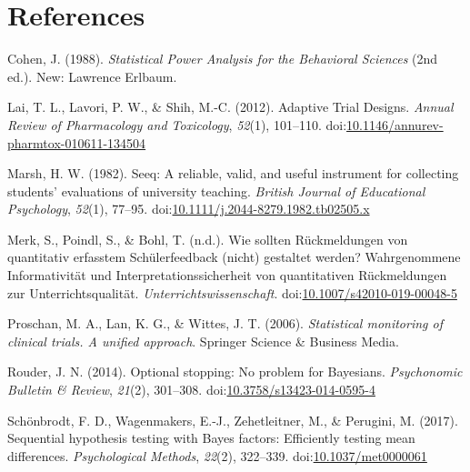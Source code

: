 \documentclass[man]{apa6}
\begin{document}
\hypertarget{references}{%
\section{References}\label{references}}

\begingroup
\setlength{\parindent}{-0.5in}
\setlength{\leftskip}{0.5in}

\hypertarget{refs}{}
\leavevmode\hypertarget{ref-cohen1988}{}%
Cohen, J. (1988). \emph{Statistical Power Analysis for the Behavioral Sciences} (2nd ed.). New: Lawrence Erlbaum.

\leavevmode\hypertarget{ref-lai2012}{}%
Lai, T. L., Lavori, P. W., \& Shih, M.-C. (2012). Adaptive Trial Designs. \emph{Annual Review of Pharmacology and Toxicology}, \emph{52}(1), 101--110. doi:\href{https://doi.org/10.1146/annurev-pharmtox-010611-134504}{10.1146/annurev-pharmtox-010611-134504}

\leavevmode\hypertarget{ref-marsh1982}{}%
Marsh, H. W. (1982). Seeq: A reliable, valid, and useful instrument for collecting students' evaluations of university teaching. \emph{British Journal of Educational Psychology}, \emph{52}(1), 77--95. doi:\href{https://doi.org/10.1111/j.2044-8279.1982.tb02505.x}{10.1111/j.2044-8279.1982.tb02505.x}

\leavevmode\hypertarget{ref-merk2019ip}{}%
Merk, S., Poindl, S., \& Bohl, T. (n.d.). Wie sollten Rückmeldungen von quantitativ erfasstem Schülerfeedback (nicht) gestaltet werden? Wahrgenommene Informativität und Interpretationssicherheit von quantitativen Rückmeldungen zur Unterrichtsqualität. \emph{Unterrichtswissenschaft}. doi:\href{https://doi.org/10.1007/s42010-019-00048-5}{10.1007/s42010-019-00048-5}

\leavevmode\hypertarget{ref-proschan2006}{}%
Proschan, M. A., Lan, K. G., \& Wittes, J. T. (2006). \emph{Statistical monitoring of clinical trials. A unified approach}. Springer Science \& Business Media.

\leavevmode\hypertarget{ref-rouder2014}{}%
Rouder, J. N. (2014). Optional stopping: No problem for Bayesians. \emph{Psychonomic Bulletin \& Review}, \emph{21}(2), 301--308. doi:\href{https://doi.org/10.3758/s13423-014-0595-4}{10.3758/s13423-014-0595-4}

\leavevmode\hypertarget{ref-schonbrodt2017c}{}%
Schönbrodt, F. D., Wagenmakers, E.-J., Zehetleitner, M., \& Perugini, M. (2017). Sequential hypothesis testing with Bayes factors: Efficiently testing mean differences. \emph{Psychological Methods}, \emph{22}(2), 322--339. doi:\href{https://doi.org/10.1037/met0000061}{10.1037/met0000061}
\end{document}
